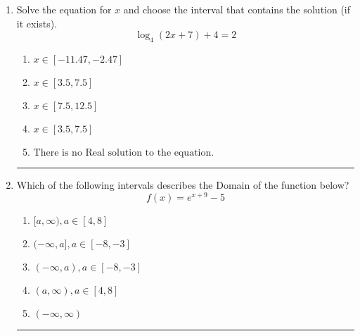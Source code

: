 \documentclass[14pt]{extbook}
\newcommand{\litem}[1]{\item#1\hspace*{-1cm}\rule{\textwidth}{0.4pt}}
\begin{document}
\begin{enumerate}
{\begin{enumerate}[label=\Alph*.]
\end{enumerate} }
\litem{
Solve the equation for $x$ and choose the interval that contains the solution (if it exists).\[ \log_{4}{(2x+7)}+4 = 2 \]\begin{enumerate}[label=\Alph*.]
\item \( x \in [-11.47, -2.47] \)
\item \( x \in [3.5, 7.5] \)
\item \( x \in [7.5, 12.5] \)
\item \( x \in [3.5, 7.5] \)
\item \( \text{There is no Real solution to the equation.} \)

\end{enumerate} }
\litem{
Which of the following intervals describes the Domain of the function below?\[ f(x) = e^{x+9}-5 \]\begin{enumerate}[label=\Alph*.]
\item \( [a, \infty), a \in [4, 8] \)
\item \( (-\infty, a], a \in [-8, -3] \)
\item \( (-\infty, a), a \in [-8, -3] \)
\item \( (a, \infty), a \in [4, 8] \)
\item \( (-\infty, \infty) \)

\end{enumerate} }
\end{enumerate}
\end{document}

